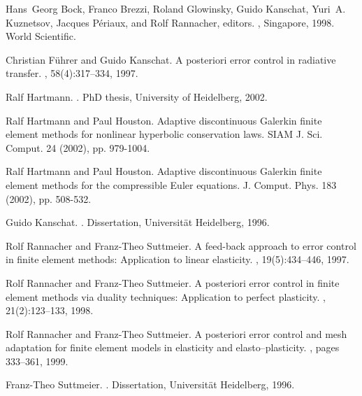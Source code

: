 \documentclass{article}
\begin{document}
\begin{thebibliography}{10}
Hans~Georg Bock, Franco Brezzi, Roland Glowinsky, Guido Kanschat, Yuri~A.
  Kuznetsov, Jacques P\'eriaux, and Rolf Rannacher, editors.
, Singapore, 1998. World
  Scientific.

Christian F{\"u}hrer and Guido Kanschat.
\newblock A posteriori error control in radiative transfer.
, 58(4):317--334, 1997.

Ralf Hartmann.
.
\newblock PhD thesis, University of Heidelberg, 2002.

Ralf Hartmann and Paul Houston.
\newblock Adaptive discontinuous {G}alerkin finite element methods for
  nonlinear hyperbolic conservation laws.
\newblock SIAM J. Sci. Comput. 24 (2002), pp. 979-1004.

Ralf Hartmann and Paul Houston.
\newblock Adaptive discontinuous {G}alerkin finite element methods for the
  compressible {E}uler equations.
\newblock J. Comput. Phys. 183 (2002), pp. 508-532.

Guido Kanschat.
.
\newblock Dissertation, Universit{\"a}t Heidelberg, 1996.

Rolf Rannacher and Franz-Theo Suttmeier.
\newblock A feed-back approach to error control in finite element methods:
  Application to linear elasticity.
, 19(5):434--446, 1997.

Rolf Rannacher and Franz-Theo Suttmeier.
\newblock A posteriori error control in finite element methods via duality
  techniques: Application to perfect plasticity.
, 21(2):123--133, 1998.

Rolf Rannacher and Franz-Theo Suttmeier.
\newblock A posteriori error control and mesh adaptation for finite element
  models in elasticity and elasto--plasticity.
, pages 333--361, 1999.

Franz-Theo Suttmeier.
.
\newblock Dissertation, Universit{\"a}t Heidelberg, 1996.

\end{thebibliography}
\end{document}
